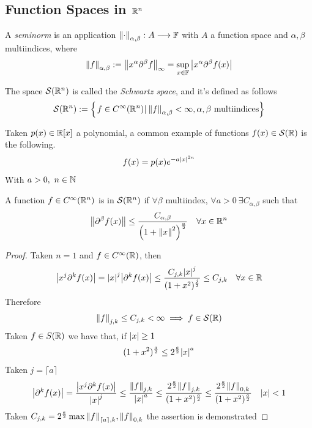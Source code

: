 \documentclass[../complete.tex]{subfiles}
\begin{document}
\subsection{Function Spaces in $\mathbb{R}^n$}
\begin{dfn}[Seminorm]
	A \textit{seminorm} is an application $\norm{\cdot}_{\alpha,\beta}:A\overset{}{\longrightarrow}\mathbb{F}$ with $A$ a function space and $\alpha,\beta$ multiindices, where
	\begin{equation}
		\norm{f}_{\alpha,\beta}:=\norm{x^\alpha\partial^\beta f}_\infty=\sup_{x\in\mathbb{F}}\abs{x^\alpha\partial^\beta f(x)}
		\label{eq:seminorm}
	\end{equation}
\end{dfn}
\begin{dfn}
	The space $\mathcal{S}(\mathbb{R}^n)$ is called the \textit{Schwartz space}, and it's defined as follows
	\begin{equation}
		\mathcal{S}(\mathbb{R}^n):=\left\{ \left.f\in C^\infty(\mathbb{R}^n)\right|_{}\norm{f}_{\alpha,\beta}<\infty, \alpha,\beta\text{ multiindices} \right\}
		\label{eq:schwartzspace}
	\end{equation}
\end{dfn}
\begin{eg}
	Taken $p(x)\in\mathbb{R}[x]$ a polynomial, a common example of functions $f(x)\in\mathcal{S}(\mathbb{R})$ is the following.
	\begin{equation}
		f(x)=p(x)e^{-a\abs{x}^{2n}}
		\label{eq:schwartzfunc}
	\end{equation}
	With $a>0,\ n\in\mathbb{N}$
\end{eg}
\begin{thm}
	A function $f\in C^\infty(\mathbb{R}^n)$ is in $\mathcal{S}(\mathbb{R}^n)$ if $\forall\beta$ multiindex, $\forall a>0\ \exists C_{\alpha,\beta}$ such that
	\begin{equation}
		\norm{\partial^\beta f(x)}\le\frac{C_{\alpha,\beta}}{\left( 1+\norm{x}^2 \right)^{\frac{a}{2}}}\quad\forall x\in\mathbb{R}^n
		\label{eq:schwartzfunc2}
	\end{equation}
\end{thm}
\begin{proof}
	Taken $n=1$ and $f\in C^\infty(\mathbb{R})$, then
	\begin{equation*}
		\abs{x^j\partial^kf(x)}=\abs{x}^j\abs{\partial^kf(x)}\le\frac{C_{j,k}\abs{x}^j}{(1+x^2)^{\frac{j}{2}}}\le C_{j,k}\quad\forall x\in\mathbb{R}
	\end{equation*}
	Therefore
	\begin{equation*}
		\norm{f}_{j,k}\le C_{j,k}<\infty\implies{} f\in\mathcal{S}(\mathbb{R})
	\end{equation*}
	Taken $f\in{S}(\mathbb{R})$ we have that, if $\abs{x}\ge1$
	\begin{equation*}
		(1+x^2)^{\frac{a}{2}}\le 2^{\frac{a}{2}}\abs{x}^a
	\end{equation*}
	Taken $j=\lceil a\rceil$
	\begin{equation*}
		\abs{\partial^kf(x)}=\frac{\abs{x^j\partial^kf(x)}}{\abs{x}^j}\le\frac{\norm{f}_{j,k}}{\abs{x}^a}\le\frac{2^{\frac{a}{2}}\norm{f}_{j,k}}{(1+x^2)^{\frac{a}{2}}}\le\frac{2^{\frac{a}{2}}\norm{f}_{0,k}}{(1+x^2)^{\frac{a}{2}}}\quad\abs{x}<1
	\end{equation*}
	Taken $C_{j,k}=2^{\frac{a}{2}}\max{\norm{f}_{\lceil a\rceil,k},\norm{f}_{0,k}}$ the assertion is demonstrated
\end{proof}
\end{document}

